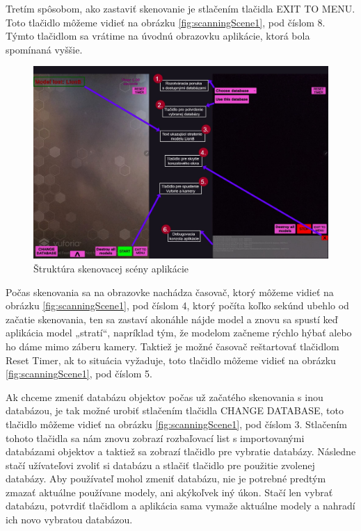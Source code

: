 Tretím spôsobom, ako zastaviť skenovanie je stlačením tlačidla EXIT TO MENU. Toto tlačidlo môžeme vidieť na obrázku \ref{fig:scanningScene1}, pod číslom 8. Týmto tlačidlom sa vrátime na úvodnú obrazovku aplikácie, ktorá bola spomínaná vyššie. 

\begin{figure}[!h]
  \centering
  \includegraphics[width=1\textwidth]{img/Scanning_scene_part2Collapse.jpg}
  \caption{Štruktúra skenovacej scény aplikácie}
  \label{fig:scanningScene2}
\end{figure}

Počas skenovania sa na obrazovke nachádza časovač, ktorý môžeme vidieť na obrázku \ref{fig:scanningScene1}, pod číslom 4, ktorý počíta koľko sekúnd ubehlo od začatie skenovania, ten sa zastaví akonáhle nájde model a znovu sa spustí keď aplikácia model „stratí“, napríklad tým, že modelom začneme rýchlo hýbať alebo ho dáme mimo záberu kamery. Taktiež je možné časovač reštartovať tlačidlom Reset Timer, ak to situácia vyžaduje, toto tlačidlo môžeme vidieť na obrázku \ref{fig:scanningScene1}, pod číslom 5. 

Ak chceme zmeniť databázu objektov počas už začatého skenovania s inou databázou, je tak možné urobiť stlačením tlačidla CHANGE DATABASE, toto tlačidlo môžeme vidieť na obrázku \ref{fig:scanningScene1}, pod číslom 3. Stlačením tohoto tlačidla sa nám znovu zobrazí rozbaľovací list s importovanými databázami objektov a taktiež sa zobrazí tlačidlo pre vybratie databázy. Následne stačí užívateľovi zvoliť si databázu a stlačiť tlačidlo pre použitie zvolenej databázy. Aby používateľ mohol zmeniť databázu, nie je potrebné predtým zmazať aktuálne používane modely, ani akýkoľvek iný úkon. Stačí len vybrať databázu, potvrdiť tlačidlom a aplikácia sama vymaže aktuálne modely a nahradí ich novo vybratou databázou.

